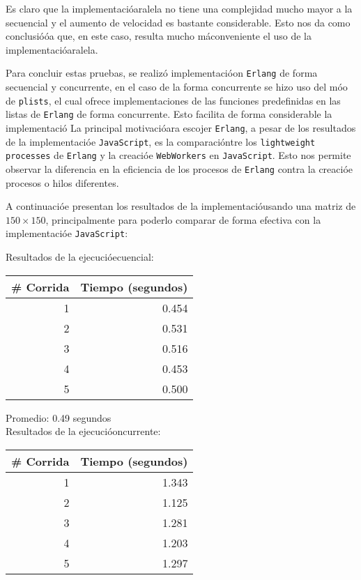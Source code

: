 \documentclass[10pt,letterpaper,oneside]{article}
\begin{document}
{Es claro que la implementacióaralela no tiene una complejidad mucho mayor a la secuencial y el aumento de velocidad es bastante considerable. Esto nos da como conclusióóa que, en este caso, resulta mucho máconveniente el uso de la implementacióaralela.

Para concluir estas pruebas, se realizó implementacióon \verb!Erlang! de forma secuencial y concurrente, en el caso de la forma concurrente se hizo uso del móo de \verb!plists!, el cual ofrece implementaciones de las funciones predefinidas en las listas de \verb!Erlang! de forma concurrente. Esto facilita de forma considerable la implementació
La principal motivacióara escojer \verb!Erlang!, a pesar de los resultados de la implementacióe \verb!JavaScript!, es la comparacióntre los \verb!lightweight processes! de \verb!Erlang! y la creacióe \verb!WebWorkers! en \verb!JavaScript!. Esto nos permite observar la diferencia en la eficiencia de los procesos de \verb!Erlang! contra la creacióe procesos o hilos diferentes.

A continuacióe presentan los resultados de la implementacióusando una matriz de $150\times150$, principalmente para poderlo comparar de forma efectiva con la implementacióe \verb!JavaScript!:

\begin{center}

    Resultados de la ejecucióecuencial:
    
    \begin{tabular}{|r|r|}
    \hline
    \hline
    \# Corrida & Tiempo (segundos)  \\
    \hline
    \hline
    1 & 0.454 \\
    2 & 0.531 \\
    3 & 0.516 \\
    4 & 0.453 \\
    5 & 0.500 \\
    \hline
    \end{tabular}
    
    Promedio: 0.49 segundos\\
    \medskip
    \medskip
    \medskip
    Resultados de la ejecucióoncurrente:
    
    \begin{tabular}{|r|r|}
    \hline
    \hline
    \# Corrida & Tiempo (segundos)  \\
    \hline
    \hline
    1 & 1.343 \\
    2 & 1.125 \\
    3 & 1.281\\
    4 & 1.203 \\
    5 & 1.297 \\
    \hline
    \end{tabular}
    

\end{center}}
\end{document}
